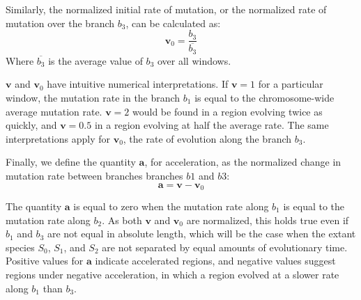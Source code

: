 \documentclass{article} %
\begin{document}
Similarly, the normalized initial rate of mutation, or the normalized rate of mutation over the branch $b_3$, can be calculated as:
\begin{equation*}
	\textbf{v}_0 = \frac{b_3}{\overline{b_3}}
\end{equation*}
Where $\overline{b_3}$ is the average value of $b_3$ over all windows.\par
$\textbf{v}$ and $\textbf{v}_0$ have intuitive numerical interpretations. If $\textbf{v} = 1$ for a particular window, the mutation rate in the branch $b_1$ is equal to the chromosome-wide average mutation rate. $\textbf{v} = 2$ would be found in a region evolving twice as quickly, and $\textbf{v} = 0.5$ in a region evolving at half the average rate. The same interpretations apply for $\textbf{v}_0$, the rate of evolution along the branch $b_3$.\par
Finally, we define the quantity $\textbf{a}$, for acceleration, as the normalized change in mutation rate between branches branches $b1$ and $b3$:
\begin{equation*}
\textbf{a} = \textbf{v} - \textbf{v}_0
\end{equation*}

The quantity $\textbf{a}$ is equal to zero when the mutation rate along $b_1$ is equal to the mutation rate along $b_2$. As both $\textbf{v}$ and $\textbf{v}_0$ are normalized, this holds true even if $b_1$ and $b_3$ are not equal in absolute length, which will be the case when the extant species $S_0$, $S_1$, and $S_2$ are not separated by equal amounts of evolutionary time. Positive values for $\textbf{a}$ indicate accelerated regions, and negative values suggest regions under negative acceleration, in which a region evolved at a slower rate along $b_1$ than $b_3$.





 
\end{document}

